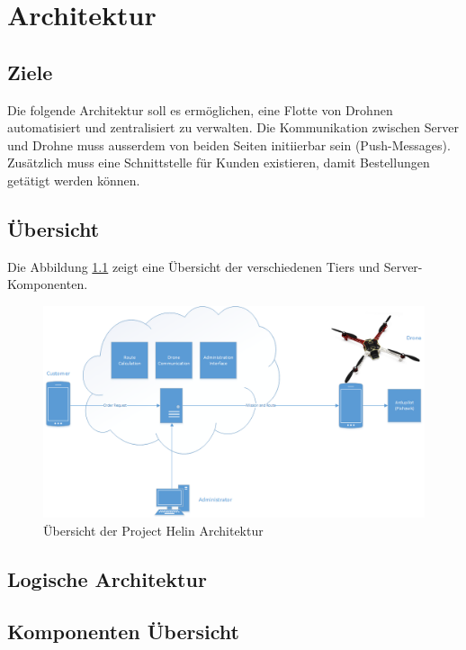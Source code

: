 \chapter{Architektur}

\section{Ziele}

Die folgende Architektur soll es ermöglichen, eine Flotte von Drohnen automatisiert und zentralisiert zu verwalten. Die Kommunikation zwischen Server und Drohne muss ausserdem von beiden Seiten initiierbar sein (Push-Messages). Zusätzlich muss eine Schnittstelle für Kunden existieren, damit Bestellungen getätigt werden können. 

\section{Übersicht}

Die Abbildung \ref{fig:architecture-overview} zeigt eine Übersicht der verschiedenen Tiers und Server-Komponenten.

\begin{figure}[h]
	\includegraphics[width=1.0\textwidth]{images/Overview-Diagram.png}
	\caption{Übersicht der Project Helin Architektur }
	\label{fig:architecture-overview}
\end{figure}

\section{Logische Architektur}

\section{Komponenten Übersicht}

